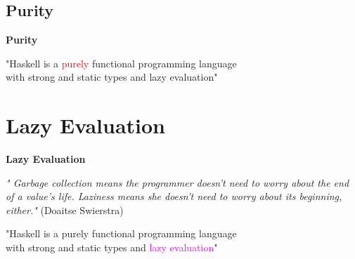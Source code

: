 \documentclass[unknownkeysallowed]{beamer}
\begin{document}

\subsection{Purity}
\begin{frame}

    \begin{center}
    \Large\textbf{Purity}
    \end{center}

\end{frame}


\begin{frame}
\begin{center}

  "Haskell is a \textcolor{red}{purely} functional programming language \\ with strong and static types and lazy evaluation"
  
\end{center}
\end{frame}

  
\section{Lazy Evaluation}
\begin{frame}

    \begin{center}
    \Large\textbf{Lazy Evaluation} \scriptsize \bigskip
    
    \textit{" Garbage collection means the programmer doesn't need to worry about the end of 
    a value's life. Laziness means she doesn't need to worry about its beginning, 
    either."}
    (Doaitse Swierstra)
    
    \end{center}

\end{frame}


\begin{frame}
\begin{center}

  "Haskell is a purely functional programming language \\ with strong and static types and \textcolor{magenta}{lazy evaluation}"
  
\end{center}
\end{frame}
\end{document}
